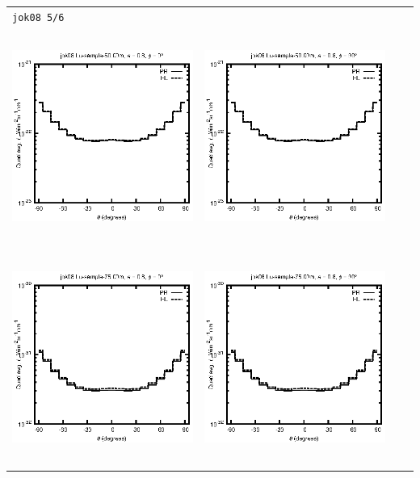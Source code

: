 \documentclass[10pt,a4paper]{article}
\begin{document}
\begin{adjustwidth}{-1.2in}{-1.2in}
\begin{tabular}{c c c c}
\multicolumn{4}{l}{\texttt{jok08 5/6}} \\
\includegraphics[height=7cm]{../eps/jok08_Lu_sample_50.00m_fwd.eps} &
\includegraphics[height=7cm]{../eps/jok08_Lu_sample_50.00m_cross.eps} \\
\includegraphics[height=7cm]{../eps/jok08_Lu_sample_75.00m_fwd.eps} &
\includegraphics[height=7cm]{../eps/jok08_Lu_sample_75.00m_cross.eps} \\

\end{tabular}
\end{adjustwidth}
\end{document}
